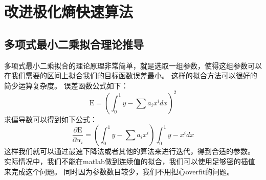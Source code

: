 \documentclass{article}
\begin{document}
\section{改进极化熵快速算法}
\subsection{多项式最小二乘拟合理论推导}
多项式最小二乘拟合的理论原理非常简单，就是选取一组参数，使得这组参数可以在我们需要的区间上拟合我们的目标函数误差最小。
这样的拟合方法可以很好的简少运算复杂度。
误差函数公式如下：
\begin{equation}
\mbox{E} = \left(\int_0^1y-\sum a_ix^idx\right)^2
\end{equation}
求偏导数可以得到如下公式：
\begin{equation}
\frac{\partial\mbox{E}}{\partial\alpha_i} = \left(\int_0^1y-\sum a_ix^i\right)\int_0^1y-x^idx
\end{equation}
这样我们就可以通过最速下降法或者其他的算法来进行迭代，得到合适的参数。
实际情况中，我们不能在matlab做到连续值的拟合，我们可以使用足够密的插值来完成这个问题。
同时因为参数数目较少，我们不用担心overfit的问题。
\end{document}
